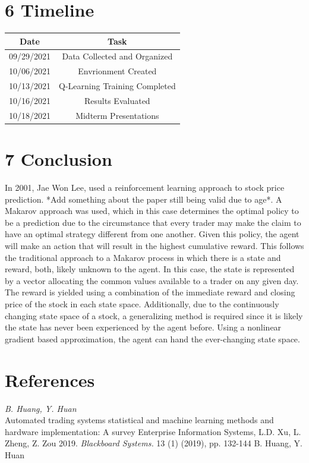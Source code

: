\documentclass[letterpaper]{article}
\begin{document}
\section{6 Timeline}
\begin{center}
\begin{tabular}{||c|c|||} 
 \hline
 Date & Task \\ [0.5ex] 
 \hline\hline
 09/29/2021 & Data Collected and Organized \\ 
 \hline
 10/06/2021 & Envrionment Created \\
 \hline
 10/13/2021 & Q-Learning Training Completed \\
 \hline
 10/16/2021 & Results Evaluated \\
 \hline
 10/18/2021 & Midterm Presentations \\ [1ex] 
 \hline
\end{tabular}
\end{center}

\section{7 Conclusion}
In 2001, Jae Won Lee, used a reinforcement learning approach to stock price prediction. *Add something about the paper still being valid due to age*. A Makarov approach was used, which in this case determines the optimal policy to be a prediction due to the circumstance that every trader may make the claim to have an optimal strategy different from one another. Given this policy, the agent will make an action that will result in the highest cumulative reward. This follows the traditional approach to a Makarov process in which there is a state and reward, both, likely unknown to the agent. In this case, the state is represented by a vector allocating the common values available to a trader on any given day. The reward is yielded using a combination of the immediate reward and closing price of the stock in each state space. Additionally, due to the continuously changing state space of a stock, a generalizing method is required since it is likely the state has never been experienced by the agent before. Using a nonlinear gradient based approximation, the agent can hand the ever-changing state space.

\section{References}
\smallskip \noindent \textit{B. Huang, Y. Huan}\\
Automated trading systems statistical and machine learning methods and hardware implementation: A survey Enterprise Information Systems, L.D. Xu, L. Zheng, Z. Zou 2019. \textit{Blackboard Systems.} 13 (1) (2019), pp. 132-144
B. Huang, Y. Huan
\end{document}
